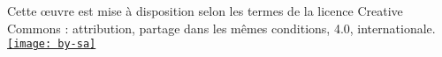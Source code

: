\center
\vfill
\aldine
\vfill
Cette œuvre est mise à disposition selon les termes de la licence Creative Commons : attribution, partage dans les mêmes conditions, 4.0, internationale.\\[1em]

\href{http://creativecommons.org/licenses/by-sa/4.0/}{\texttt{[image: by-sa]}}
\vfill
